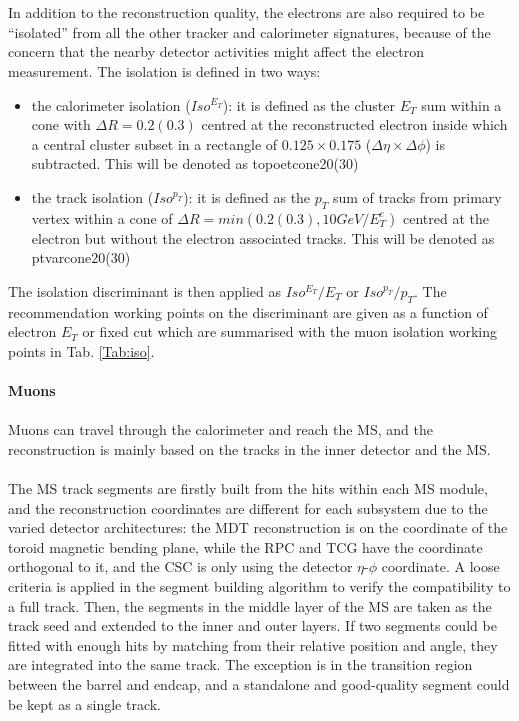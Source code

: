 \\
\\In addition to the reconstruction quality, the electrons are also required to be ``isolated'' from all the other tracker and calorimeter signatures, because of the concern that the nearby detector activities might affect the electron measurement. The isolation is defined in two ways: 
\begin{itemize}
	\item the calorimeter isolation ($Iso^{E_{T}}$): it is defined as the cluster $E_{T}$ sum within a cone with $\Delta R=0.2(0.3)$ centred at the reconstructed electron inside which a central cluster subset in a rectangle of $0.125 \times 0.175$ ($\Delta \eta \times \Delta \phi$) is subtracted. This will be denoted as topoetcone20(30)
	\item the track isolation ($Iso^{p_{T}}$): it is defined as the $p_{T}$ sum of tracks from primary vertex within a cone of $\Delta R=min(0.2(0.3), 10GeV/E^{e}_{T})$ centred at the electron but without the electron associated tracks. This will be denoted as ptvarcone20(30) 
\end{itemize}
The isolation discriminant is then applied as $Iso^{E_{T}}/E_{T}$ or $Iso^{p_T}/p_{T}$. The recommendation working points on the discriminant are given as a function of electron $E_{T}$ or fixed cut which are summarised with the muon isolation working points in Tab. \ref{Tab:iso}. 
\\
\\{\bf Muons \cite{Herde:2059849}}
\\
\\Muons can travel through the calorimeter and reach the MS, and the reconstruction is mainly based on the tracks in the inner detector and the MS. 
\\
\\The MS track segments are firstly built from the hits within each MS module, and the reconstruction coordinates are different for each subsystem due to the varied detector architectures: the MDT reconstruction is on the coordinate of the toroid magnetic bending plane, while the RPC and TCG have the coordinate orthogonal to it, and the CSC is only using the detector $\eta$-$\phi$ coordinate. A loose criteria is applied in the segment building algorithm to verify the compatibility to a full track. Then, the segments in the middle layer of the MS are taken as the track seed and extended to the inner and outer layers. If two segments could be fitted with enough hits by matching from their relative position and angle, they are integrated into the same track. The exception is in the transition region between the barrel and endcap, and a standalone and good-quality segment could be kept as a single track.  
